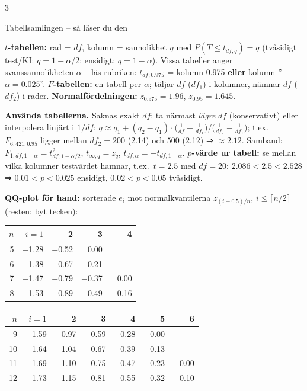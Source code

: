 \documentclass[8pt]{extarticle}
\makeatletter
\newcounter{sect}
\newcommand{\sect}[3][hd]{\par\vspace{1.5pt}\refstepcounter{sect}\noindent
  {\setlength{\fboxsep}{1.8pt}\colorbox{#1}{\parbox{\dimexpr\linewidth-2\fboxsep}{\color{white}\sffamily\bfseries
  \strut\thesect\enspace #2}}}\label{#3}\par\nobreak\vspace{0.8pt}\@afterheading}
\makeatother
\begin{document}
\begin{multicols*}{3}
\sect[cTenta]{Tabellsamlingen – så läser du den}{sec:tab}
{\fontsize{7}{8}\selectfont\setlength{\tabcolsep}{1.6pt}\renewcommand{\arraystretch}{0.9}
\textbf{$t$-tabellen:} rad = $df$, kolumn = sannolikhet $q$ med $P(T\le t_{df;q})=q$ (tvåsidigt test/KI: $q=1-\alpha/2$; ensidigt: $q=1-\alpha$). Vissa tabeller anger svanssannolikheten $\alpha$ – läs rubriken: $t_{df;0.975}$ = kolumn 0.975 \textbf{eller} kolumn ”$\alpha=0.025$”.
\textbf{$F$-tabellen:} en tabell per $\alpha$; täljar-$df$ ($df_1$) i kolumner, nämnar-$df$ ($df_2$) i rader. \textbf{Normalfördelningen:} $z_{0.975}=1.96$, $z_{0.95}=1.645$.

\par\smallskip
\noindent\begin{minipage}{\linewidth}
\textbf{Använda tabellerna.} Saknas exakt $df$: ta närmast \emph{lägre} $df$ (konservativt) eller interpolera linjärt i $1/df$: $q\approx q_1+(q_2-q_1)\cdot\bigl(\tfrac1{df}-\tfrac1{df_1}\bigr)/\bigl(\tfrac1{df_2}-\tfrac1{df_1}\bigr)$; t.ex.\ $F_{6,421;0.95}$ ligger mellan $df_2=200$ (2.14) och $500$ (2.12) ⇒ $\approx2.12$. Samband: $F_{1,df;1-\alpha}=t^2_{df;1-\alpha/2}$, $t_{\infty;q}=z_q$, $t_{df;\alpha}=-t_{df;1-\alpha}$.
\textbf{$p$-värde ur tabell:} se mellan vilka kolumner testvärdet hamnar, t.ex.\ $t=2.5$ med $df=20$: $2.086<2.5<2.528$ ⇒ $0.01<p<0.025$ ensidigt, $0.02<p<0.05$ tvåsidigt.
\end{minipage}

\par\smallskip
\noindent\begin{minipage}{\linewidth}
\textbf{QQ-plot för hand:} sorterade $e_i$ mot normalkvantilerna $z_{(i-0.5)/n}$, $i\le\lceil n/2\rceil$ (resten: byt tecken):\\
\begin{tabular}[t]{@{}r|*{4}{r}@{}}
$n$ & $i=1$ & 2 & 3 & 4\\\hline
5 & $-$1.28 & $-$0.52 & 0.00 & \\
6 & $-$1.38 & $-$0.67 & $-$0.21 & \\
7 & $-$1.47 & $-$0.79 & $-$0.37 & 0.00\\
8 & $-$1.53 & $-$0.89 & $-$0.49 & $-$0.16
\end{tabular}\hfill
\begin{tabular}[t]{@{}r|*{6}{r}@{}}
$n$ & $i=1$ & 2 & 3 & 4 & 5 & 6\\\hline
9 & $-$1.59 & $-$0.97 & $-$0.59 & $-$0.28 & 0.00 & \\
10 & $-$1.64 & $-$1.04 & $-$0.67 & $-$0.39 & $-$0.13 & \\
11 & $-$1.69 & $-$1.10 & $-$0.75 & $-$0.47 & $-$0.23 & 0.00\\
12 & $-$1.73 & $-$1.15 & $-$0.81 & $-$0.55 & $-$0.32 & $-$0.10
\end{tabular}
\end{minipage}
}

\end{multicols*}
\end{document}
